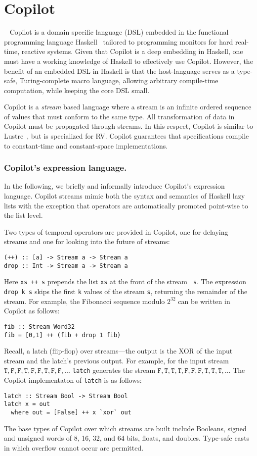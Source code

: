 \section{Copilot}~\label{sec:co-intro} 
Copilot is a domain specific language (DSL)  embedded in the functional
programming language Haskell~\cite{Haskell98}   tailored to
programming monitors for hard real-time, reactive systems. Given that
Copilot is a deep embedding in Haskell, one must have a working
knowledge of Haskell to effectively use Copilot. However, the benefit of an
embedded DSL in Haskell is that the host-language serves as a type-safe,
Turing-complete macro language, allowing arbitrary compile-time computation,
while keeping the core DSL small.

Copilot is a \emph{stream} based language where a stream is an infinite ordered
sequence of values that must conform to the same type.  All transformation of
data in Copilot must be propagated through streams.  In this respect, Copilot is
similar to Lustre~\cite{CaspiPHP87}, but is specialized for RV. Copilot
guarantees that specifications compile to constant-time and constant-space
implementations.

\subsubsection{Copilot's expression language.}
In the following, we briefly and informally introduce Copilot's expression
language.  Copilot streams mimic both the syntax and semantics of
Haskell lazy lists with the exception that  operators are
automatically promoted point-wise to the list level. 

Two types of temporal operators are provided in Copilot, one for
delaying streams and one for looking into the future of streams:
\begin{lstlisting}[frame=single]
(++) :: [a] -> Stream a -> Stream a
drop :: Int -> Stream a -> Stream a
\end{lstlisting}
%
Here {\tt xs ++ s} prepends the list {\tt xs} at the front of the stream {\tt
  s}.  The expression {\tt drop k s} skips the first {\tt k} values of the
stream {\tt s}, returning the remainder of the stream. For example, the
Fibonacci sequence modulo $2^{32}$ can be written in Copilot as follows:

\begin{lstlisting}[frame=single]
fib :: Stream Word32
fib = [0,1] ++ (fib + drop 1 fib)
\end{lstlisting}
%
Recall, a 
latch (flip-flop) over streams---the output is the XOR of the input stream and
the latch's previous output.  For example, for the input stream
$\mathtt{T, F, F, T, F, F, T, F, F,}\dots$
{\tt latch} generates the stream
$\mathtt{F, T, T, T, F, F, F, T, T, T,}\ldots$
The Copliot implementaton of {\tt latch} is as follows:
%
\begin{lstlisting}[frame=single]
latch :: Stream Bool -> Stream Bool
latch x = out
  where out = [False] ++ x `xor` out
\end{lstlisting}
%
The base types of Copilot over which streams are built include Booleans, signed
and unsigned words of 8, 16, 32, and 64 bits, floats, and doubles. Type-safe
casts in which overflow cannot occur are permitted.

